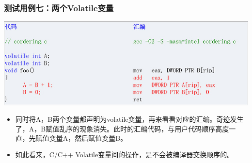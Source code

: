 \documentclass[9pt,b5paper]{article}
\begin{document}
\subsubsection{测试用例七：两个Volatile变量}
\label{sec-8-3-3}
\includegraphics[width=.9\linewidth]{../pic/v8.jpg}
\begin{itemize}
\item 同时将A，B两个变量都声明为volatile变量，再来看看对应的汇编。奇迹发生了，A，B赋值乱序的现象消失。此时的汇编代码，与用户代码顺序高度一直，先赋值变量A，然后赋值变量B。
\item 如此看来，C/C++ Volatile变量间的操作，是不会被编译器交换顺序的。
\end{itemize}
\end{document}
